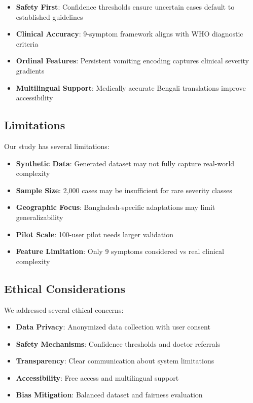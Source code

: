 \documentclass[conference]{IEEEtran}
\begin{document}
\begin{itemize}
\item \textbf{Safety First}: Confidence thresholds ensure uncertain cases default to established guidelines
\item \textbf{Clinical Accuracy}: 9-symptom framework aligns with WHO diagnostic criteria
\item \textbf{Ordinal Features}: Persistent vomiting encoding captures clinical severity gradients
\item \textbf{Multilingual Support}: Medically accurate Bengali translations improve accessibility
\end{itemize}

\subsection{Limitations}
Our study has several limitations:

\begin{itemize}
\item \textbf{Synthetic Data}: Generated dataset may not fully capture real-world complexity
\item \textbf{Sample Size}: 2,000 cases may be insufficient for rare severity classes
\item \textbf{Geographic Focus}: Bangladesh-specific adaptations may limit generalizability
\item \textbf{Pilot Scale}: 100-user pilot needs larger validation
\item \textbf{Feature Limitation}: Only 9 symptoms considered vs real clinical complexity
\end{itemize}

\subsection{Ethical Considerations}
We addressed several ethical concerns:

\begin{itemize}
\item \textbf{Data Privacy}: Anonymized data collection with user consent
\item \textbf{Safety Mechanisms}: Confidence thresholds and doctor referrals
\item \textbf{Transparency}: Clear communication about system limitations
\item \textbf{Accessibility}: Free access and multilingual support
\item \textbf{Bias Mitigation}: Balanced dataset and fairness evaluation
\end{itemize}
\end{document}
